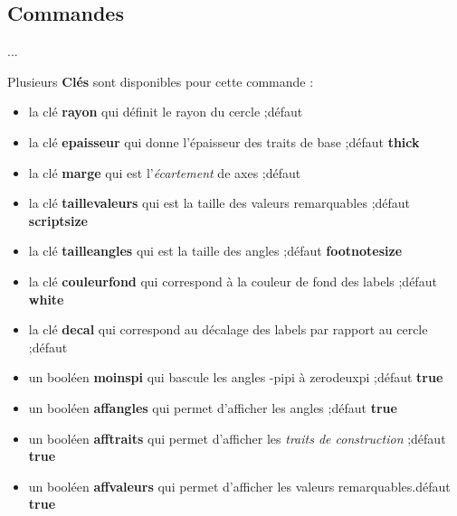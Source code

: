 \documentclass{article}
\newcommand\Cle[1]{{\bfseries\sffamily\textlangle #1\textrangle}}
\begin{document}
\begin{codetex}
\cercletrigoPL
\end{codetex}

\subsection{Commandes}

\begin{codetex}
...
\end{codetex}

\begin{codecles}
Plusieurs \Cle{Clés} sont disponibles pour cette commande :

\begin{itemize}
	\item la clé \Cle{rayon} qui définit le rayon du cercle ;\hfill{}défaut \Cle{3}
	\item la clé \Cle{epaisseur} qui donne l'épaisseur des traits de base ;\hfill{}défaut \Cle{thick}
	\item la clé \Cle{marge} qui est l'\textit{écartement} de axes  ;\hfill{}défaut \Cle{0.25}
	\item la clé \Cle{taillevaleurs} qui est la taille des valeurs remarquables ;\hfill{}défaut \Cle{scriptsize}
	\item la clé \Cle{tailleangles} qui est la taille des angles ;\hfill{}défaut \Cle{footnotesize}
	\item la clé \Cle{couleurfond} qui correspond à la couleur de fond des labels ;\hfill{}défaut \Cle{white}
	\item la clé \Cle{decal} qui correspond au décalage des labels par rapport au cercle ;\hfill{}défaut \Cle{10pt}
	\item un booléen \Cle{moinspi} qui bascule les angles \og -pipi \fg{} à \og zerodeuxpi \fg{} ;\hfill{}défaut \Cle{true}
	\item un booléen \Cle{affangles} qui permet d'afficher les angles ;\hfill{}défaut \Cle{true}
	\item un booléen \Cle{afftraits} qui permet d'afficher les \textit{traits de construction}  ;\hfill{}défaut \Cle{true}
	\item un booléen \Cle{affvaleurs} qui permet d'afficher les valeurs remarquables.\hfill{}défaut \Cle{true}
\end{itemize}
\end{codecles}
\end{document}
